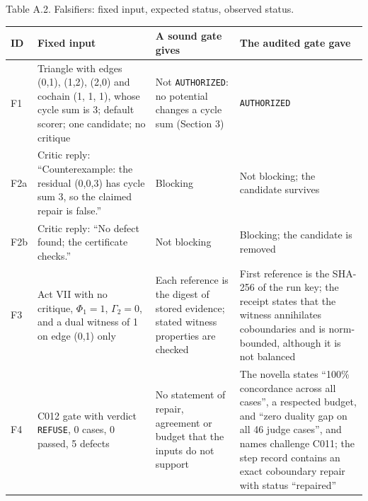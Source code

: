 \documentclass[
  11pt,
]{article}
\newcommand{\passthrough}[1]{#1}
\begin{document}
Table A.2. Falsifiers: fixed input, expected status, observed status.

\begin{longtable}[]{@{}
  >{\raggedright\arraybackslash}p{}
  >{\raggedright\arraybackslash}p{}
  >{\raggedright\arraybackslash}p{}
  >{\raggedright\arraybackslash}p{}@{}}
\toprule\noalign{}
\begin{minipage}[b]{\linewidth}\raggedright
ID
\end{minipage} & \begin{minipage}[b]{\linewidth}\raggedright
Fixed input
\end{minipage} & \begin{minipage}[b]{\linewidth}\raggedright
A sound gate gives
\end{minipage} & \begin{minipage}[b]{\linewidth}\raggedright
The audited gate gave
\end{minipage} \\
\midrule\noalign{}
\endhead
\bottomrule\noalign{}
\endlastfoot
F1 & Triangle with edges (0,1), (1,2), (2,0) and cochain (1, 1, 1),
whose cycle sum is 3; default scorer; one candidate; no critique & Not
\passthrough{\lstinline!AUTHORIZED!}: no potential changes a cycle sum
(Section 3) & \passthrough{\lstinline!AUTHORIZED!} \\
F2a & Critic reply: ``Counterexample: the residual (0,0,3) has cycle sum
3, so the claimed repair is false.'' & Blocking & Not blocking; the
candidate survives \\
F2b & Critic reply: ``No defect found; the certificate checks.'' & Not
blocking & Blocking; the candidate is removed \\
F3 & Act VII with no critique, \(\Phi_1 = 1\), \(\Gamma_2 = 0\), and a
dual witness of 1 on edge (0,1) only & Each reference is the digest of
stored evidence; stated witness properties are checked & First reference
is the SHA-256 of the run key; the receipt states that the witness
annihilates coboundaries and is norm-bounded, although it is not
balanced \\
F4 & C012 gate with verdict \passthrough{\lstinline!REFUSE!}, 0 cases, 0
passed, 5 defects & No statement of repair, agreement or budget that the
inputs do not support & The novella states ``100\% concordance across
all cases'', a respected budget, and ``zero duality gap on all 46 judge
cases'', and names challenge C011; the step record contains an exact
coboundary repair with status ``repaired'' \\
\end{longtable}
\end{document}
